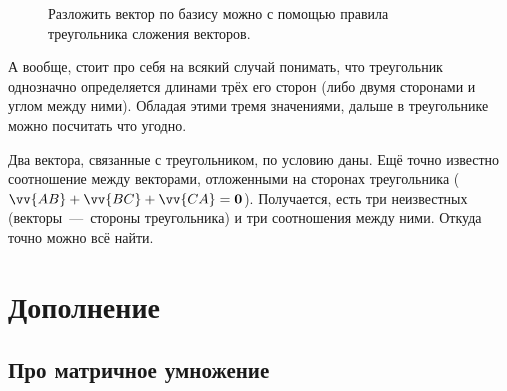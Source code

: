 \documentclass[a4paper,12pt]{article}
\begin{document}
\begin{solution}
\begin{figure}[h]
      
      \caption{Разложить вектор по базису можно с помощью правила треугольника сложения векторов.}
      \label{fig:physi-way}
    \end{figure}
    
    А вообще, стоит про себя на всякий случай понимать, что треугольник однозначно определяется длинами трёх его сторон (либо двумя сторонами и углом между ними).
    Обладая этими тремя значениями, дальше в треугольнике можно посчитать что угодно.
    
    Два вектора, связанные с треугольником, по условию даны.
    Ещё точно известно соотношение между векторами, отложенными на сторонах треугольника ($\vv{AB} \hm+ \vv{BC} \hm+ \vv{CA} \hm= \bds 0$).
    Получается, есть три неизвестных (векторы~---~стороны треугольника) и три соотношения между ними.
    Откуда точно можно всё найти.
  \end{solution}
  
  
  \section{Дополнение}
  
  \subsection{Про матричное умножение}
  
\end{document}

